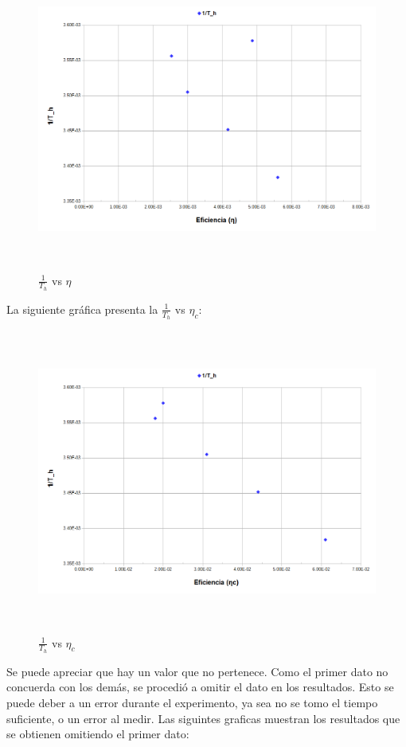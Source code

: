 \documentclass[12pt]{article}
\begin{document}
	\begin{figure}[H]
		\centering
		\includegraphics[width=\textwidth , height = 10cm]{1-TvsNMal.png}  
		\caption{$\frac{1}{T_h}$ vs $\eta$}
		\label{nMal}
	\end{figure}

La siguiente gráfica presenta la $\frac{1}{T_h}$ vs $\eta_c$:

	\begin{figure}[H]
		\centering
		\includegraphics[width=\textwidth , height = 10cm]{1-TvsNcMal.png}  
		\caption{$\frac{1}{T_h}$ vs $\eta_c$}
		\label{ncMal}
	\end{figure}


Se puede apreciar que hay un valor que no pertenece. Como el primer dato no concuerda con los demás, se procedió a omitir el dato en los resultados. Esto se puede deber a un error durante el experimento, ya sea no se tomo el tiempo suficiente, o un error al medir. Las siguintes graficas muestran los resultados que se obtienen omitiendo el primer dato:
\end{document}
